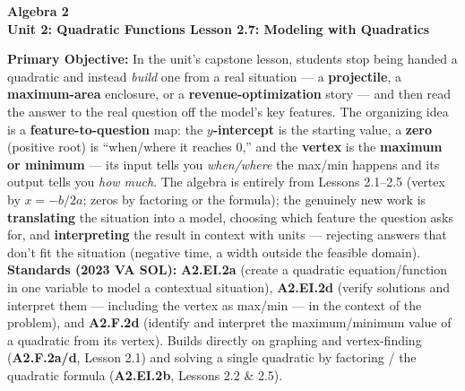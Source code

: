 \documentclass[10pt]{article}
\newcommand{\CourseName}{Algebra 2}
\newcommand{\UnitNumberName}{Unit 2: Quadratic Functions \quad}
\newcommand{\LessonNumberName}{Lesson 2.7: Modeling with Quadratics}
\begin{document}
\begin{center}
    {\Large\bfseries \CourseName \\
    {\small\bfseries \UnitNumberName \LessonNumberName}}
\end{center}

\begin{tcolorbox}[colback=forestbg, colframe=forest, boxrule=0.9pt, arc=2mm,
    left=2mm, right=2mm, top=1.5mm, bottom=1.5mm]
    \textbf{Primary Objective:} In the unit's capstone lesson, students stop being handed a quadratic and instead
    \emph{build} one from a real situation --- a \textbf{projectile}, a \textbf{maximum-area} enclosure, or a
    \textbf{revenue-optimization} story --- and then read the answer to the real question off the model's key
    features. The organizing idea is a \textbf{feature-to-question} map: the \textbf{$y$-intercept} is the starting
    value, a \textbf{zero} (positive root) is ``when/where it reaches $0$,'' and the \textbf{vertex} is the
    \textbf{maximum or minimum} --- its input tells you \emph{when/where} the max/min happens and its output tells you
    \emph{how much}. The algebra is entirely from Lessons 2.1--2.5 (vertex by $x=-b/2a$; zeros by factoring or the
    formula); the genuinely new work is \textbf{translating} the situation into a model, choosing which feature the
    question asks for, and \textbf{interpreting} the result in context with units --- rejecting answers that don't fit
    the situation (negative time, a width outside the feasible domain).
    \\[2pt]
    \textbf{Standards (2023 VA SOL):} \textbf{A2.EI.2a} (create a quadratic equation/function in one variable to
    model a contextual situation), \textbf{A2.EI.2d} (verify solutions and interpret them --- including the vertex as
    max/min --- in the context of the problem), and \textbf{A2.F.2d} (identify and interpret the maximum/minimum
    value of a quadratic from its vertex). Builds directly on graphing and vertex-finding (\textbf{A2.F.2a/d}, Lesson
    2.1) and solving a single quadratic by factoring / the quadratic formula (\textbf{A2.EI.2b}, Lessons 2.2 \& 2.5).
\end{tcolorbox}
\end{document}
